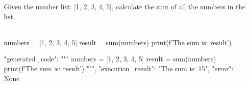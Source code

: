 \begin{textcolorbox}
Given the number list: [1, 2, 3, 4, 5], calculate the sum of all the numbers in the list.
\\\\
\begin{codebox}
    numbers = [1, 2, 3, 4, 5]
    result = sum(numbers)
    print(f'The sum is: {result}')
\end{codebox}
\begin{codebox}
{
    "generated_code": """
    numbers = [1, 2, 3, 4, 5]
    result = sum(numbers)
    print(f'The sum is: {result}')
    """,
    "execution_result": "The sum is: 15",
    "error": None
}
\end{codebox}

\end{textcolorbox}
